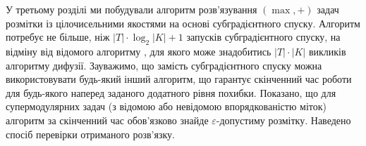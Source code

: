 \chapterConclusion

У третьому розділі ми побудували алгоритм розв’язування $(\max ,+)$ задач розмітки із
цілочисельними якостями на основі субградієнтного спуску.
Алгоритм потребує не більше, ніж $|T|\cdot \log_2 |K| + 1$
запусків субградієнтного спуску,
на відміну від відомого алгоритму \cite{diffusion_shlezinger},
для якого може знадобитись $|T|\cdot|K|$ викликів алгоритму дифузії.
Зауважимо, що замість субградієнтного спуску можна використовувати
будь-який інший алгоритм, що гарантує скінченний час роботи
для будь-якого наперед заданого додатного рівня похибки.
Показано, що для
супермодулярних задач (з відомою або невідомою впорядкованістю міток) алгоритм
за скінченний час обов'язково знайде $\varepsilon$-допустиму розмітку.
Наведено спосіб перевірки отриманого розв'язку.

